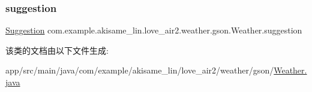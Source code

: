 \subsubsection{\texorpdfstring{suggestion}{suggestion}}
{\footnotesize\ttfamily \mbox{\hyperlink{classcom_1_1example_1_1akisame__lin_1_1love__air2_1_1weather_1_1gson_1_1_suggestion}{Suggestion}} com.\+example.\+akisame\+\_\+lin.\+love\+\_\+air2.\+weather.\+gson.\+Weather.\+suggestion}



该类的文档由以下文件生成\+:\begin{DoxyCompactItemize}
\item 
app/src/main/java/com/example/akisame\+\_\+lin/love\+\_\+air2/weather/gson/\mbox{\hyperlink{java_2com_2example_2akisame__lin_2love__air2_2weather_2gson_2_weather_8java}{Weather.\+java}}\end{DoxyCompactItemize}
